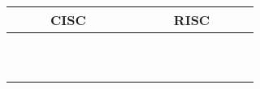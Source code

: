 \renewcommand{\arraystretch}{1.7}
\begin{table}[!htb]
\centering
  \begin{tabular}{|c|c|}
  	\hline
	~~~~~\acs{CISC}~~~~~ & ~~~~~\acs{RISC}~~~~~\\ \hline\hline
& \\ \hline
& \\ \hline
& \\ \hline
& \\ \hline
& \\ \hline
& \\ \hline
& \\ \hline
& \\ \hline
& \\ \hline
& \\ \hline
  \end{tabular}
\end{table}
\renewcommand{\arraystretch}{1.0}

